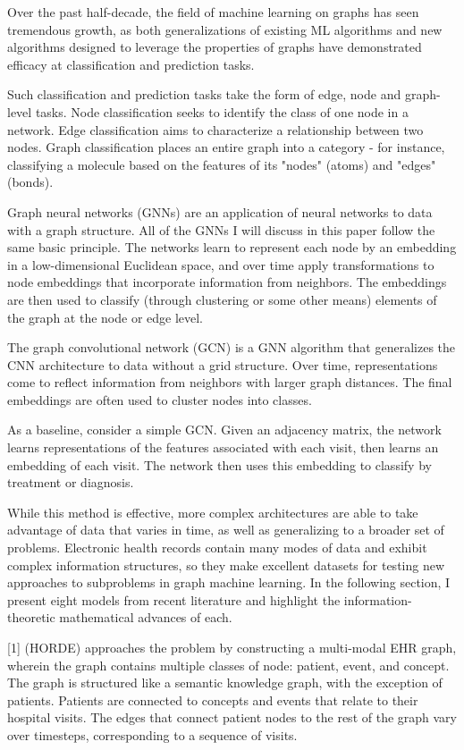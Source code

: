 \documentclass{article}
\begin{document}
Over the past half-decade, the field of machine learning on graphs has seen tremendous growth, as both generalizations of existing ML algorithms and new algorithms designed to leverage the properties of graphs have demonstrated efficacy at classification and prediction tasks. 

Such classification and prediction tasks take the form of edge, node and graph-level tasks. Node classification seeks to identify the class of one node in a network. Edge classification aims to characterize a relationship between two nodes. Graph classification places an entire graph into a category - for instance, classifying a molecule based on the features of its "nodes" (atoms) and "edges" (bonds). 

Graph neural networks (GNNs) are an application of neural networks to data with a graph structure. All of the GNNs I will discuss in this paper follow the same basic principle. The networks learn to represent each node by an embedding in a low-dimensional Euclidean space, and over time apply transformations to node embeddings that incorporate information from neighbors. The embeddings are then used to classify (through clustering or some other means) elements of the graph at the node or edge level. 

The graph convolutional network (GCN) is a GNN algorithm that generalizes the CNN architecture to data without a grid structure. Over time, representations come to reflect information from neighbors with larger graph distances. The final embeddings are often used to cluster nodes into classes. 


As a baseline, consider a simple GCN.  Given an adjacency matrix, the network learns representations of the features associated with each visit, then learns an embedding of each visit. The network then uses this embedding to classify by treatment or diagnosis. 

While this method is effective, more complex architectures are able to take advantage of data that varies in time, as well as generalizing to a broader set of problems. Electronic health records contain many modes of data and exhibit complex information structures, so they make excellent datasets for testing new approaches to subproblems in graph machine learning. In the following section, I present eight models from recent literature and highlight the information-theoretic mathematical advances of each. 

[1] (HORDE) approaches the problem by constructing a multi-modal EHR graph, wherein the graph contains multiple classes of node: patient, event, and concept. The graph is structured like a semantic knowledge graph, with the exception of patients. Patients are connected to concepts and events that relate to their hospital visits. The edges that connect patient nodes to the rest of the graph vary over timesteps, corresponding to a sequence of visits.
\end{document}
